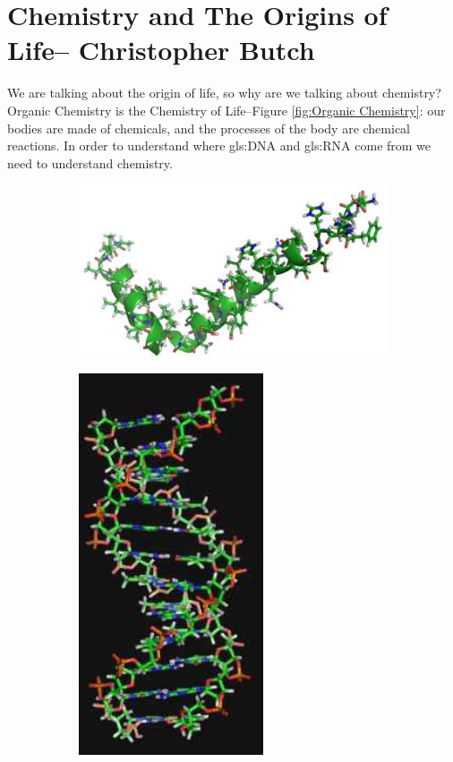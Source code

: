 \documentclass[]{article}
\begin{document}
\section[Chemistry and The Origins of Life]{Chemistry and The Origins of Life-- Christopher Butch}


We are talking about the origin of life, so why are we talking about chemistry? Organic Chemistry is the Chemistry of Life--Figure \ref{fig:Organic Chemistry}: our bodies are made of chemicals, and the processes of the body are chemical reactions. In order to understand where \gls{gls:DNA} and \gls{gls:RNA} come from we need to understand chemistry.


\begin{figure}[H]
	\caption {Organic Chemistry is the Chemistry of Life}\label{fig:Organic Chemistry}
	\begin{subfigure}[b]{0.55\textwidth}
		\includegraphics[width=\textwidth]{OrgChem1}
	\end{subfigure}
	\;
	\begin{subfigure}[b]{0.35\textwidth}
		\includegraphics[width=0.6\textwidth]{OrgChem2}

\end{subfigure}
\end{figure}
\end{document}
